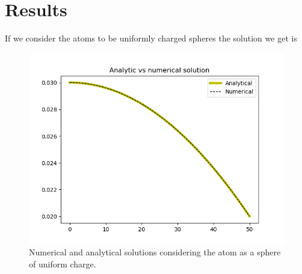 \documentclass[12pt]{article}
\begin{document}
\section{Results}
If we consider the atoms to be uniformly charged spheres the solution we get is
\begin{figure}[h!]
    \centering
   \includegraphics[width=0.7\linewidth]{comp}
    \caption{Numerical and analytical solutions considering the atom as a sphere of uniform charge. }
    \label{unif}
\end{figure}
\end{document}
